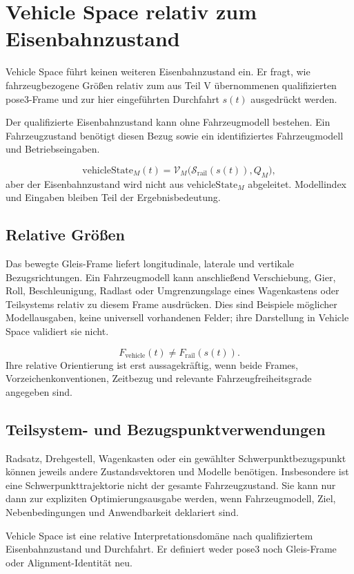 \chapter{Vehicle Space relativ zum Eisenbahnzustand}
\label{chap:vehicle-space}

Vehicle Space führt keinen weiteren Eisenbahnzustand ein. Er fragt, wie
fahrzeugbezogene Größen relativ zum aus Teil V übernommenen qualifizierten
pose3-Frame und zur hier eingeführten Durchfahrt \(s(t)\) ausgedrückt werden.

\begin{principle}
Der qualifizierte Eisenbahnzustand kann ohne Fahrzeugmodell bestehen. Ein
Fahrzeugzustand benötigt diesen Bezug sowie ein identifiziertes Fahrzeugmodell
und Betriebseingaben.
\end{principle}

\begin{proposition}[Zustandshierarchie]
\label{prop:state-hierarchy}
\[
\mathrm{vehicleState}_M(t)
=
\mathcal V_M\bigl(
\mathcal S_{\mathrm{rail}}(s(t)),Q_M
\bigr),
\]
aber der Eisenbahnzustand wird nicht aus
\(\mathrm{vehicleState}_M\) abgeleitet. Modellindex und Eingaben bleiben Teil
der Ergebnisbedeutung.
\end{proposition}

\section{Relative Größen}

Das bewegte Gleis-Frame liefert longitudinale, laterale und vertikale
Bezugsrichtungen. Ein Fahrzeugmodell kann anschließend Verschiebung, Gier,
Roll, Beschleunigung, Radlast oder Umgrenzungslage eines Wagenkastens oder
Teilsystems relativ zu diesem Frame ausdrücken. Dies sind Beispiele möglicher
Modellausgaben, keine universell vorhandenen Felder; ihre Darstellung in
Vehicle Space validiert sie nicht.

\[
F_{\mathrm{vehicle}}(t)\neq
F_{\mathrm{rail}}(s(t)).
\]
Ihre relative Orientierung ist erst aussagekräftig, wenn beide Frames,
Vorzeichenkonventionen, Zeitbezug und relevante Fahrzeugfreiheitsgrade
angegeben sind.

\section{Teilsystem- und Bezugspunktverwendungen}

Radsatz, Drehgestell, Wagenkasten oder ein gewählter Schwerpunktbezugspunkt
können jeweils andere Zustandsvektoren und Modelle benötigen. Insbesondere ist
eine Schwerpunkttrajektorie nicht der gesamte Fahrzeugzustand. Sie kann nur
dann zur expliziten Optimierungsausgabe werden, wenn Fahrzeugmodell, Ziel,
Nebenbedingungen und Anwendbarkeit deklariert sind.

\begin{summary}
Vehicle Space ist eine relative Interpretationsdomäne nach qualifiziertem
Eisenbahnzustand und Durchfahrt. Er definiert weder pose3 noch Gleis-Frame oder
Alignment-Identität neu.
\end{summary}
